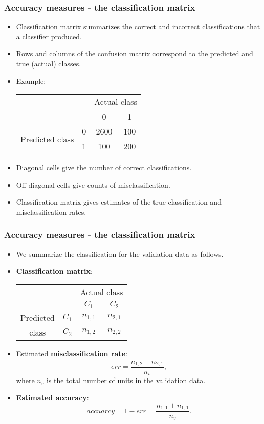 \documentclass{beamer}
\begin{document}
\begin{frame}
\frametitle{Accuracy measures - the classification matrix}
\begin{itemize}
  \item Classification matrix summarizes the correct and incorrect classifications
that a classifier produced.
  \item Rows and columns
of the confusion matrix correspond to the predicted and true (actual) classes.
\item Example:\\[-2mm]
\begin{tabular}{cccc}

 &  & \multicolumn{2}{|l}{Actual class} \\
  & & \multicolumn{1}{|c}{0} & 1 \\\hline
\multirow{2}{*}{Predicted class} & 0 & \multicolumn{1}{|c}{2600} & 100 \\
 & 1 & \multicolumn{1}{|c}{100} & 200 \\
\end{tabular}
\item Diagonal cells give the number of
correct classifications.
\item Off-diagonal cells give counts of misclassification.
\item Classification matrix gives estimates of the true classification and misclassification
rates.
\end{itemize}
\end{frame}

\begin{frame}
\frametitle{Accuracy measures - the classification matrix}
\begin{itemize}
\item We summarize the classification for the validation data as follows.
\item \textbf{Classification matrix}:\\[-2mm]
\begin{center}
\begin{tabular}{cccc}

 &  & \multicolumn{2}{|l}{Actual class} \\
  & & \multicolumn{1}{|c}{$C_1$} & $C_2$ \\\hline
\multirow{1}{*}{Predicted} & $C_1$ & \multicolumn{1}{|c}{$n_{1,1}$} & $n_{2,1}$\\
class & $C_2$ & \multicolumn{1}{|c}{$n_{1,2}$} & $n_{2,2}$ \\
\end{tabular}
\end{center}
\item Estimated \textbf{misclassification rate}: $$err=\frac{n_{1,2}+n_{2,1}}{n_v},$$ where $n_v$ is the total number of units in the validation data.
\item \textbf{Estimated accuracy}: $$accuarcy = 1- err=\frac{n_{1,1}+n_{1,1}}{n_v}.$$
\end{itemize}
\end{frame}
\end{document}
